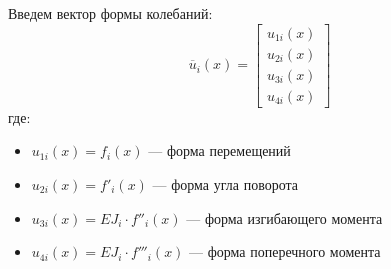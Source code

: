 Введем вектор формы колебаний:
\begin{equation}
    \label{eq6}
    \overline{u}_i(x) = 
    \begin{bmatrix}
        u_{1i}(x)
        \\
        u_{2i}(x)
        \\
        u_{3i}(x)
        \\
        u_{4i}(x)
    \end{bmatrix}
\end{equation}
где:
\begin{itemize}
    \item $u_{1i}(x) = f_i(x)$ --- форма перемещений
    \item $u_{2i}(x) = f'_i(x)$ --- форма угла поворота
    \item $u_{3i}(x) = EJ_i \cdot f''_i(x)$ --- форма изгибающего момента
    \item $u_{4i}(x) = EJ_i \cdot f'''_i(x)$ --- форма поперечного момента
\end{itemize}

